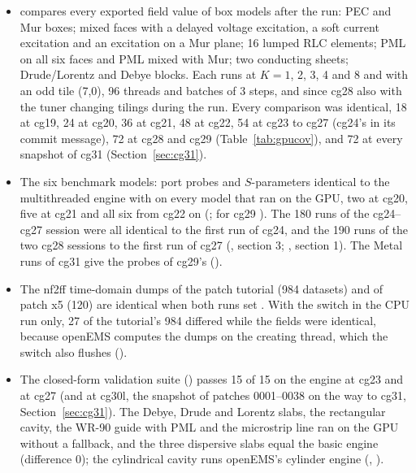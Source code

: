 \begin{itemize}
\item {} compares every exported field value of box models after the run: PEC
  and Mur boxes; mixed faces with a delayed voltage excitation, a soft current excitation and an excitation on a Mur
  plane; 16 lumped RLC elements; PML on all six faces and PML mixed with Mur; two conducting sheets; Drude/Lorentz and
  Debye blocks. Each runs at $K=1$, 2, 3, 4 and 8 and with an odd tile (7,0), 96 threads and batches of 3 steps, and
  since cg28 also with the tuner changing tilings during the run. Every comparison was identical, 18 at cg19, 24 at
  cg20, 36 at cg21, 48 at cg22, 54 at cg23 to cg27 (cg24's in its commit message), 72 at cg28 and cg29
  (Table~\ref{tab:gpucov}), and 72 at every snapshot of cg31 (Section~\ref{sec:cg31}).
\item The six benchmark models: port probes and $S$-parameters identical to the multithreaded engine with
   on every model that ran on the GPU, two at cg20, five at cg21 and all six from cg22 on
  (; for cg29 ). The 180 runs of the cg24--cg27 session were
  all identical to the first run of cg24, and the 190 runs of the two cg28 sessions to the first run of cg27
  (, section 3;
  , section 1). The Metal runs of cg31 give the probes of
  cg29's ().
\item The nf2ff time-domain dumps of the patch tutorial (984 datasets) and of patch x5 (120) are identical when both
  runs set . With the switch in the CPU run only, 27 of the tutorial's 984 differed while the
  fields were identical, because openEMS computes the dumps on the creating thread, which the switch also flushes
  ().
\item The closed-form validation suite () passes 15 of 15 on the engine at cg23 and at cg27
  (and at cg30l, the snapshot of patches 0001--0038 on the way to cg31, Section~\ref{sec:cg31}).
  The Debye, Drude and Lorentz slabs, the rectangular cavity, the WR-90 guide with PML and the microstrip line ran on
  the GPU without a fallback, and the three dispersive slabs equal the basic engine (difference 0); the cylindrical
  cavity runs openEMS's cylinder engine (,
  ).
\end{itemize}
